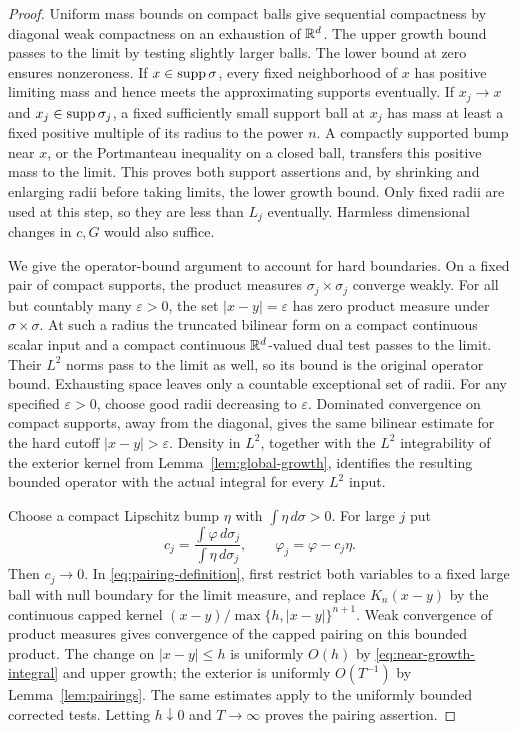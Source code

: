 \begin{proof}
Uniform mass bounds on compact balls give sequential compactness by
diagonal weak compactness on an exhaustion of $\mathbb R^d$. The upper
growth bound passes to the limit by testing slightly larger balls.
The lower bound at zero ensures nonzeroness. If $x\in\operatorname{supp}\sigma$,
every fixed neighborhood of $x$ has positive limiting mass and hence
meets the approximating supports eventually. If $x_j\to x$ and
$x_j\in\operatorname{supp}\sigma_j$, a fixed sufficiently small support ball at
$x_j$ has mass at least a fixed positive multiple of its radius to
the power $n$. A compactly supported bump near $x$, or the
Portmanteau inequality on a closed ball, transfers this positive mass
to the limit. This proves both support assertions and, by shrinking
and enlarging radii before taking limits, the lower growth bound.
Only fixed radii are used at this step, so they are less than $L_j$
eventually. Harmless dimensional changes in $c,G$ would also suffice.

We give the operator-bound argument to account for hard boundaries.
On a fixed pair of compact supports, the product measures
$\sigma_j\times\sigma_j$ converge weakly. For all but countably many
$\varepsilon>0$, the set $|x-y|=\varepsilon$ has zero product measure
under $\sigma\times\sigma$. At such a radius the truncated bilinear
form on a compact continuous scalar input and a compact continuous
$\mathbb R^d$-valued dual test passes to the limit. Their
$L^2$ norms pass to the limit as well, so its bound is the original
operator bound. Exhausting space leaves only a countable exceptional
set of radii. For any specified $\varepsilon>0$, choose good radii
decreasing to $\varepsilon$. Dominated convergence on compact supports,
away from the diagonal, gives the same bilinear estimate for the hard
cutoff $|x-y|>\varepsilon$. Density in $L^2$, together with the
$L^2$ integrability of the exterior kernel from
Lemma~\ref{lem:global-growth}, identifies the resulting bounded
operator with the actual integral for every $L^2$ input.

Choose a compact Lipschitz bump $\eta$ with $\int\eta\,d\sigma>0$.
For large $j$ put
\[
 c_j=\frac{\int\varphi\,d\sigma_j}{\int\eta\,d\sigma_j},
 \qquad \varphi_j=\varphi-c_j\eta.
\]
Then $c_j\to0$. In \eqref{eq:pairing-definition}, first restrict
both variables to a fixed large ball with null boundary for the limit
measure, and replace $K_n(x-y)$ by the continuous capped kernel
$(x-y)/\max\{h,|x-y|\}^{n+1}$. Weak convergence of product measures
gives convergence of the capped pairing on this bounded product.
The change on $|x-y|\le h$ is uniformly $O(h)$ by
\eqref{eq:near-growth-integral} and upper growth; the
exterior is uniformly $O(T^{-1})$ by Lemma~\ref{lem:pairings}.
The same estimates apply to the uniformly bounded corrected tests.
Letting $h\downarrow0$ and $T\to\infty$ proves the pairing assertion.
\end{proof}

